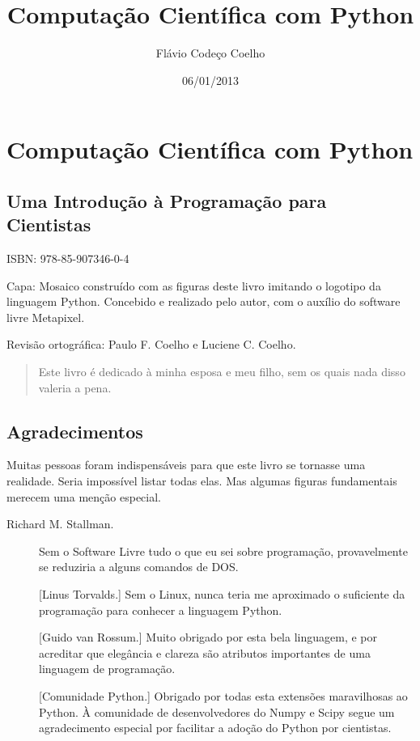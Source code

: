 \documentclass[a4paper,10pt,brazil]{sphinxmanual}
\title{Computação Científica com Python}
\date{06/01/2013}
\author{Flávio Codeço Coelho}
\begin{document}
\maketitle
\tableofcontents
{}\label{index::doc}



\chapter{Computação Científica com Python}
\label{main::doc}\label{main:computacao-cientifica-com-python}

\section{Uma Introdução à Programação para Cientistas}
\label{main:uma-introducao-a-programacao-para-cientistas}
ISBN: 978-85-907346-0-4

Capa: Mosaico construído com as figuras deste livro imitando o
logotipo da linguagem Python. Concebido e realizado pelo autor, com
o auxílio do software livre Metapixel.

Revisão ortográfica: Paulo F. Coelho e Luciene C. Coelho.
\begin{quote}

Este livro é dedicado à minha esposa e meu filho, sem os quais nada
disso valeria a pena.
\end{quote}


\section{Agradecimentos}
\label{main:agradecimentos}
Muitas pessoas foram indispensáveis para que este livro se tornasse
uma realidade. Seria impossível listar todas elas. Mas algumas
figuras fundamentais merecem uma menção especial.
\begin{description}
\item[{Richard M. Stallman.}] \leavevmode
Sem o Software Livre tudo o que eu sei sobre programação,
provavelmente se reduziria a alguns comandos de DOS.

{[}Linus Torvalds.{]} Sem o Linux, nunca teria me aproximado o
suficiente da programação para conhecer a linguagem Python.

{[}Guido van Rossum.{]} Muito obrigado por esta bela linguagem, e por
acreditar que elegância e clareza são atributos importantes de uma
linguagem de programação.

{[}Comunidade Python.{]} Obrigado por todas esta extensões maravilhosas
ao Python. À comunidade de desenvolvedores do Numpy e Scipy segue
um agradecimento especial por facilitar a adoção do Python por
cientistas.

\end{description}
\end{document}
